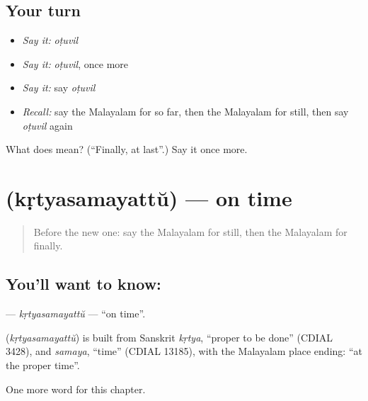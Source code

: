 \subsection*{Your turn}
\begin{itemize}
\raggedright
  \item \emph{Say it:} \emph{oṭuvil}
  \item \emph{Say it:} \emph{oṭuvil}, once more
  \item \emph{Say it:} say \emph{oṭuvil}
  \item \emph{Recall:} say the Malayalam for so far, then the Malayalam for still, then say \emph{oṭuvil} again
\end{itemize}

\begin{tcolorbox}[breakable,colback=teal!4,colframe=teal!35!black,title={Before you move on}]
What does  mean? (\textquotedblleft{}Finally, at last\textquotedblright{}.) Say it once more.
\end{tcolorbox}
\section[\texorpdfstring{\ml{കൃത്യസമയത്ത്} (kṛtyasamayattŭ)}{കൃത്യസമയത്ത് (kṛtyasamayattŭ)}]{ (kṛtyasamayattŭ) — on time}

\label{lesson:ML-C196-krtyasamayattu}



\begin{quote}
Before the new one: say the Malayalam for still, then the Malayalam for finally.
\end{quote}

\subsection*{You'll want to know: }
\textbf{} — \emph{kṛtyasamayattŭ} — \textquotedblleft{}on time\textquotedblright{}.

\begin{cousinweb}
\textbf{} (\emph{kṛtyasamayattŭ}) is built from Sanskrit \emph{kṛtya}, \textquotedblleft{}proper to be done\textquotedblright{} (CDIAL 3428), and \emph{samaya}, \textquotedblleft{}time\textquotedblright{} (CDIAL 13185), with the Malayalam place ending: \textquotedblleft{}at the proper time\textquotedblright{}.
\end{cousinweb}

\begin{grammarlens}[title={What you've built}]
One more word for this chapter.
\end{grammarlens}


